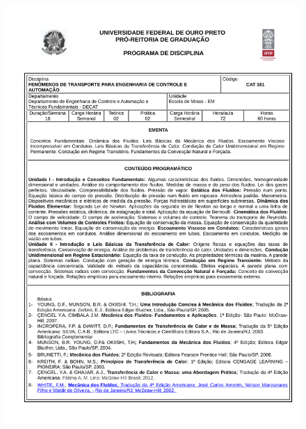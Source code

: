 \begin{figure}[p]
	\centering 
	\includegraphics[scale=0.7]{capitulos/anexo1-programas-disciplina/p41.pdf}
\end{figure}

